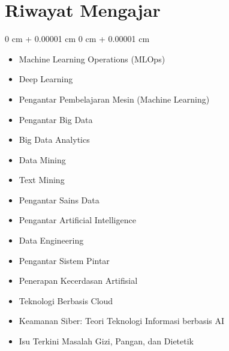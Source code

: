 \documentclass[10pt, letterpaper]{article}
\newenvironment{highlightsforbulletentries}{
    \begin{itemize}[
        topsep=0.10 cm,
        parsep=0.10 cm,
        partopsep=0pt,
        itemsep=0pt,
        leftmargin=10pt
    ]
}{
    \end{itemize}
} %
\newenvironment{onecolentry}{
    \begin{adjustwidth}{
        0 cm + 0.00001 cm
    }{
        0 cm + 0.00001 cm
    }
}{
    \end{adjustwidth}
} %
\begin{document}
\section{Riwayat Mengajar}
    \begin{onecolentry}
        \begin{highlightsforbulletentries}

        \item Machine Learning Operations (MLOps)
        \item Deep Learning
        \item Pengantar Pembelajaran Mesin (Machine Learning)
        \item Pengantar Big Data
        \item Big Data Analytics
        \item Data Mining
        \item Text Mining
        \item Pengantar Sains Data
        \item Pengantar Artificial Intelligence
        \item Data Engineering
        \item Pengantar Sistem Pintar
        \item Penerapan Kecerdasan Artifisial
        \item Teknologi Berbasis Cloud
        \item Keamanan Siber: Teori Teknologi Informasi berbasis AI
        \item Isu Terkini Masalah Gizi, Pangan, dan Dietetik

        \end{highlightsforbulletentries}
    \end{onecolentry}
\end{document}
